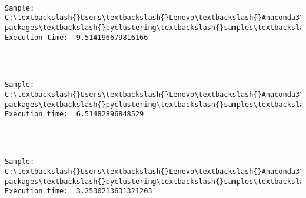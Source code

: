 \documentclass[11pt]{article}
\begin{document}
    \begin{center}
    \end{center}
    { \hspace*{\fill} \\}
    
    \begin{Verbatim}[commandchars=\\\{\}]
Sample:  C:\textbackslash{}Users\textbackslash{}Lenovo\textbackslash{}Anaconda3\textbackslash{}lib\textbackslash{}site-packages\textbackslash{}pyclustering\textbackslash{}samples\textbackslash{}samples\textbackslash{}fcps\textbackslash{}Target.data 		Execution time:  9.514196679816166 


    \end{Verbatim}

    \begin{center}
    \end{center}
    { \hspace*{\fill} \\}
    
    \begin{Verbatim}[commandchars=\\\{\}]
Sample:  C:\textbackslash{}Users\textbackslash{}Lenovo\textbackslash{}Anaconda3\textbackslash{}lib\textbackslash{}site-packages\textbackslash{}pyclustering\textbackslash{}samples\textbackslash{}samples\textbackslash{}fcps\textbackslash{}TwoDiamonds.data 		Execution time:  6.51482896848529 


    \end{Verbatim}

    \begin{center}
    \end{center}
    { \hspace*{\fill} \\}
    
    \begin{Verbatim}[commandchars=\\\{\}]
Sample:  C:\textbackslash{}Users\textbackslash{}Lenovo\textbackslash{}Anaconda3\textbackslash{}lib\textbackslash{}site-packages\textbackslash{}pyclustering\textbackslash{}samples\textbackslash{}samples\textbackslash{}fcps\textbackslash{}WingNut.data 		Execution time:  3.2530213631321203 


    \end{Verbatim}
\end{document}
